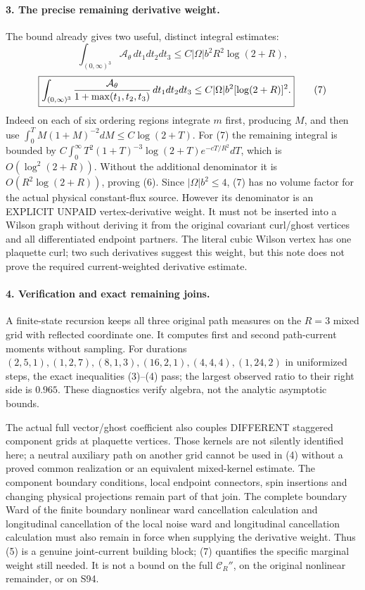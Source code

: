 \documentclass[11pt]{article}
\begin{document}
\paragraph{3. The precise remaining derivative weight.}
The bound already gives two useful, distinct integral estimates:
\[
 \int_{(0,\infty)^3}\mathcal A_\theta\,dt_1dt_2dt_3
       \le C|\Omega|b^2 R^2\log(2+R),                             \tag{6}
\]
\[
 \boxed{\int_{(0,\infty)^3}
       {\mathcal A_\theta\over1+\max(t_1,t_2,t_3)}\,dt_1dt_2dt_3
       \le C|\Omega|b^2[\log(2+R)]^2.}                            \tag{7}
\]
Indeed on each of six ordering regions integrate $m$ first, producing
$M$, and then use
$\int_0^T M(1+M)^{-2}dM\le C\log(2+T)$.
For (7) the remaining integral is bounded by
$C\int_0^\infty T^2(1+T)^{-3}\log(2+T)e^{-cT/R^2}dT$,
which is $O(\log^2(2+R))$. Without the additional denominator it is
$O(R^2\log(2+R))$, proving (6).
Since $|\Omega|b^2\le4$, (7) has no volume factor for the actual physical
constant-flux source. However its denominator is an EXPLICIT UNPAID
vertex-derivative weight. It must not be inserted into a Wilson graph
without deriving it from the original covariant curl/ghost vertices and
all differentiated endpoint partners. The literal cubic Wilson vertex has
one plaquette curl; two such derivatives suggest this weight, but this
note does not prove the required current-weighted derivative estimate.

\paragraph{4. Verification and exact remaining joins.}
A finite-state recursion keeps all three original path
measures on the $R=3$ mixed grid with reflected coordinate one. It computes
first and second path-current moments without sampling. For durations
$(2,5,1),(1,2,7),(8,1,3),(16,2,1),(4,4,4),(1,24,2)$ in uniformized steps,
the exact inequalities (3)--(4) pass; the largest observed ratio to their
right side is $0.965$. These diagnostics verify algebra, not the analytic
asymptotic bounds.

The actual full vector/ghost coefficient also couples DIFFERENT staggered
component grids at plaquette vertices. Those kernels are not silently
identified here; a neutral auxiliary path on another grid cannot be used
in (4) without a proved common realization or an equivalent mixed-kernel
estimate. The component boundary conditions, local endpoint connectors,
spin insertions and changing physical projections remain part of that
join. The complete boundary Ward of the finite boundary nonlinear ward cancellation calculation and longitudinal cancellation
of the local noise ward and longitudinal cancellation calculation must also remain in force when supplying the derivative weight.
Thus (5) is a genuine joint-current building block; (7) quantifies the
specific marginal weight still needed. It is not a bound on the full
$\mathcal C_R''$, on the original nonlinear remainder, or on S94.
\end{document}
